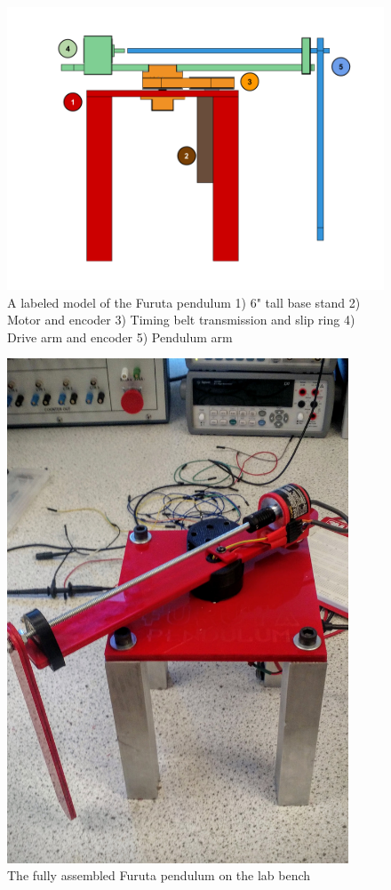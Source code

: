 \documentclass[12pt]{extarticle}
\newenvironment{sect}
  {\adjustwidth{-2.25em}{0pt}}
  {\endadjustwidth}
\begin{document}
\begin{sect}
        \begin{figure}[H]
            \centering
            \includegraphics[width=5in]{Images/Assembly.png}
            \caption{A labeled model of the Furuta pendulum 1) 6" tall base stand 2) Motor and encoder 3) Timing belt transmission and slip ring 4) Drive arm and encoder 5) Pendulum arm}
            \label{fig:assembly}
        \end{figure}
        \begin{figure}[H]
            \centering
            \includegraphics[width=4in]{Images/Bench.jpg}
            \caption{The fully assembled Furuta pendulum on the lab bench}
            \label{fig:bench}
        \end{figure}

\end{sect}
\end{document}
